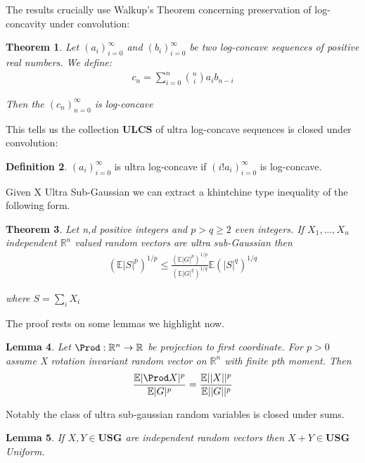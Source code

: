 \documentclass[10pt]{article}
\newcommand{\E}{\mathbb{E}}
\newcommand{\1}{\textbf{1}}
\newcommand{\R}{\mathbb{R}}
\newtheorem{theorem}{Theorem}
\newtheorem{lemma}[theorem]{Lemma}
\theoremstyle{remark}
\theoremstyle{definition}
\newtheorem{defn}[theorem]{Definition}
\begin{document}
The results crucially use Walkup's Theorem concerning preservation of log-concavity under convolution:

\begin{theorem}
	Let $(a_i)_{i=0}^{\infty}$ and $(b_i)_{i=0}^{\infty}$ be two log-concave sequences of positive real numbers. We define:
	\begin{align*}
		c_n = \sum_{i=0}^n {n \choose i} a_i b_{n-i}
	\end{align*}

	Then the $(c_n)_{n=0}^{\infty}$ is log-concave
\end{theorem}

This tells us the collection $\textbf{ULCS}$ of ultra log-concave sequences is closed under convolution:

\begin{defn}
	$(a_i)_{i=0}^{\infty}$ is ultra log-concave if $(i! a_i)_{i=0}^{\infty}$ is log-concave.
\end{defn}

Given X Ultra Sub-Gaussian we can extract a khintchine type inequality of the following form.

\begin{theorem}
	Let n,d positive integers and $p > q \geq 2$ even integers. If $X_1,...,X_n$ independent $\R^n$ valued random vectors are ultra sub-Gaussian then
	\begin{align*}
		(\E |S|^p)^{1/p} \leq \frac{(\E|G|^p)^{1/p}}{(\E|G|^q)^{1/q}}\E (|S|^q)^{1/q}
	\end{align*}

	where $S = \sum_i X_i$
\end{theorem}

The proof rests on some lemmas we highlight now.

\begin{lemma}
	Let $\Prod: \R^n \to \R$ be projection to first coordinate. For $p > 0$ assume X rotation invariant random vector on $\R^n$ with finite pth moment. Then
	\begin{align*}
		\frac{\E|\Prod X|^p}{\E |G|^p} = \frac{\E||X||^p}{\E||G||^p}
	\end{align*}
\end{lemma}

Notably the class of ultra sub-gaussian random variables is closed under sums.

\begin{lemma}
	If $X,Y \in \textbf{USG}$ are independent random vectors then $X+Y \in \textbf{USG}$Uniform.
\end{lemma}
\end{document}
